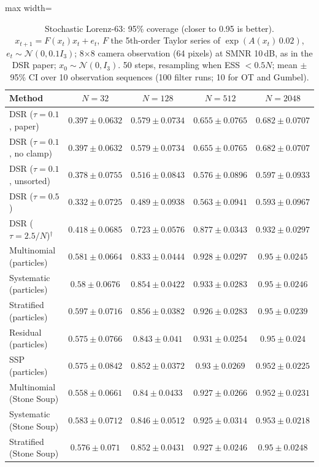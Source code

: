 \begin{table}[H]
\centering
\small
\caption{Stochastic Lorenz-63: 95\% coverage (closer to 0.95 is better). $x_{t+1}=F(x_t)x_t+e_t$, $F$ the 5th-order Taylor series of $\exp(A(x_t)\,0.02)$, $e_t\sim\mathcal N(0,0.1I_3)$; 8$\times$8 camera observation (64 pixels) at SMNR 10\,dB, as in the DSR paper; $x_0\sim\mathcal N(0,I_3)$. 50 steps, resampling when ESS $<0.5N$; mean $\pm$ 95\% CI over 10 observation sequences (100 filter runs; 10 for OT and Gumbel).}
\label{tab:lorenz63-coverage95}
\begin{adjustbox}{max width=\linewidth}
\begin{tabular}{lcccc}
\toprule
Method & $N{=}32$ & $N{=}128$ & $N{=}512$ & $N{=}2048$ \\
\midrule
DSR ($\tau{=}0.1$, paper) & $0.397\pm0.0632$ & $0.579\pm0.0734$ & $0.655\pm0.0765$ & $0.682\pm0.0707$ \\
DSR ($\tau{=}0.1$, no clamp) & $0.397\pm0.0632$ & $0.579\pm0.0734$ & $0.655\pm0.0765$ & $0.682\pm0.0707$ \\
DSR ($\tau{=}0.1$, unsorted) & $0.378\pm0.0755$ & $0.516\pm0.0843$ & $0.576\pm0.0896$ & $0.597\pm0.0933$ \\
DSR ($\tau{=}0.5$) & $0.332\pm0.0725$ & $0.489\pm0.0938$ & $0.563\pm0.0941$ & $0.593\pm0.0967$ \\
DSR ($\tau{=}2.5/N$)$^\dagger$ & $0.418\pm0.0685$ & $0.723\pm0.0576$ & $0.877\pm0.0343$ & $0.932\pm0.0297$ \\
\midrule
Multinomial (particles) & $0.581\pm0.0664$ & $0.833\pm0.0444$ & $0.928\pm0.0297$ & $0.95\pm0.0245$ \\
Systematic (particles) & $0.58\pm0.0676$ & $0.854\pm0.0422$ & $0.933\pm0.0283$ & $0.95\pm0.0246$ \\
Stratified (particles) & $0.597\pm0.0716$ & $0.856\pm0.0382$ & $0.926\pm0.0283$ & $0.95\pm0.0239$ \\
Residual (particles) & $0.575\pm0.0766$ & $0.843\pm0.041$ & $0.931\pm0.0254$ & $0.95\pm0.024$ \\
SSP (particles) & $0.575\pm0.0842$ & $0.852\pm0.0372$ & $0.93\pm0.0269$ & $0.952\pm0.0225$ \\
Multinomial (Stone Soup) & $0.558\pm0.0661$ & $0.84\pm0.0433$ & $0.927\pm0.0266$ & $0.952\pm0.0231$ \\
Systematic (Stone Soup) & $0.583\pm0.0712$ & $0.846\pm0.0512$ & $0.925\pm0.0314$ & $0.953\pm0.0218$ \\
Stratified (Stone Soup) & $0.576\pm0.071$ & $0.852\pm0.0431$ & $0.927\pm0.0246$ & $0.95\pm0.0248$ \\

\end{tabular}
\end{adjustbox}
\end{table}
